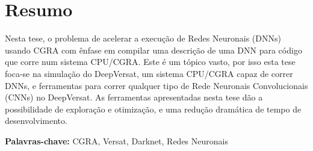 
\section*{Resumo}



Nesta tese, o problema de acelerar a execução de Redes Neuronais (DNNs) usando CGRA com ênfase em compilar uma descrição de uma DNN para código que corre num sistema
CPU/CGRA. Este é um tópico vasto, por isso esta tese foca-se na simulação do DeepVersat, um sistema CPU/CGRA capaz de correr DNNs, e ferramentas para correr qualquer tipo de Rede Neuronais Convolucionais (CNNs) no DeepVersat. 
As ferramentas apresentadas nesta tese dão a possibilidade de exploração e otimização, e uma redução dramática
de tempo de desenvolvimento.



\vfill

\textbf{\Large Palavras-chave:} CGRA, Versat, Darknet, Redes Neuronais

